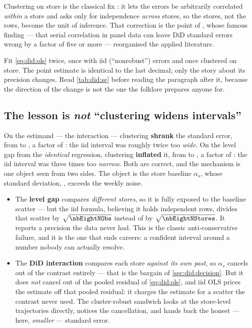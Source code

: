Clustering on store is the classical fix \citep{liang1986, cameron2015}: it lets the errors be
arbitrarily correlated \emph{within} a store and asks only for independence \emph{across} stores,
so the \nbEightNStores{} stores, not the \nbEightNObs{} rows, become the unit of inference. That
correction is the point of \citet{bertrand2004}, whose famous finding --- that serial correlation
in panel data can leave DiD standard errors wrong by a factor of five or more --- reorganised the
applied literature.

Fit \cref{eq:did:ols} twice, once with iid (``nonrobust'') errors and once clustered on store. The
point estimate is identical to the last decimal; only the story about its precision changes. Read
\cref{tab:did:se} before reading the paragraph after it, because the direction of the change is not
the one the folklore prepares anyone for.



\subsection*{The lesson is \emph{not} ``clustering widens intervals''}

On the estimand --- the interaction --- clustering \textbf{shrank} the standard error, from
\eur{\nbEightAttIidSe} to \eur{\nbEightAttClSe}, a factor of \nbEightSeRatioDid{}: the iid interval
was roughly twice too \emph{wide}. On the level gap from the \emph{identical} regression, clustering
\textbf{inflated} it, from \eur{\nbEightLvlIidSe} to \eur{\nbEightLvlClsSe}, a factor of
\nbEightSeRatioLevel: the iid interval was three times too \emph{narrow}. Both are correct, and the
mechanism is one object seen from two sides. The object is the store baseline $\alpha_s$, whose
standard deviation, \eur{\nbEightAlphaSd}, exceeds the weekly noise.

\begin{itemize}[leftmargin=*]
  \item The \textbf{level gap} compares \emph{different stores}, so it is fully exposed to the
        baseline scatter --- but the iid formula, believing it holds \nbEightNObs{} independent
        rows, divides that scatter by $\sqrt{\nbEightNObs}$ instead of by $\sqrt{\nbEightNStores}$.
        It reports a precision the data never had. This is the classic anti-conservative failure,
        and it is the one that ends careers: a confident interval around a number nobody can
        actually resolve.
  \item The \textbf{DiD interaction} compares each store \emph{against its own past}, so $\alpha_s$
        cancels out of the contrast entirely --- that is the bargain of \cref{sec:did:decision}.
        But it does \emph{not} cancel out of the pooled residual of \cref{eq:did:ols}, and iid OLS
        prices the estimate off that pooled residual: it charges the estimate for a scatter the
        contrast never used. The cluster-robust sandwich looks at the \nbEightNStores{} store-level
        trajectories directly, notices the cancellation, and hands back the honest --- here,
        \emph{smaller} --- standard error.
\end{itemize}


